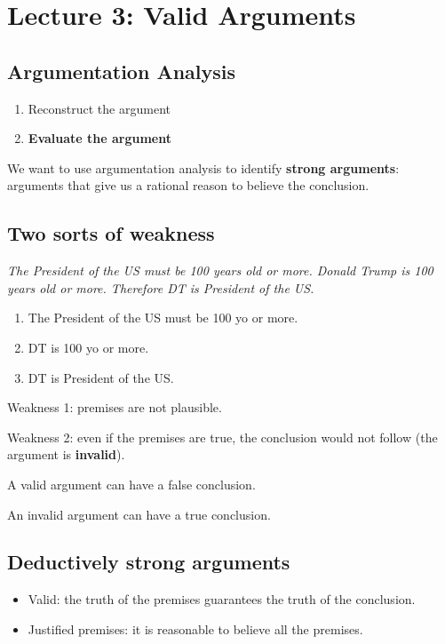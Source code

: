 
\section{Lecture 3: Valid Arguments}

\subsection{Argumentation Analysis}

\begin{enumerate}
    \item Reconstruct the argument
    \item \textbf{Evaluate the argument}
\end{enumerate}

We want to use argumentation analysis to identify
\textbf{strong arguments}: arguments that give us a rational
reason to believe the conclusion.

\subsection{Two sorts of weakness}

\textit{The President of the US must be 100 years old or more. Donald Trump
is 100 years old or more. Therefore DT is President of the US.}

\begin{enumerate}
    \item The President of the US must be 100 yo or more.
    \item DT is 100 yo or more.
    \item DT is President of the US.
\end{enumerate}

Weakness 1: premises are not plausible.

Weakness 2: even if the premises are true, the conclusion would not follow
(the argument is \textbf{invalid}).

A valid argument can have a false conclusion.

An invalid argument can have a true conclusion.

\subsection{Deductively strong arguments}

\begin{itemize}
    \item Valid: the truth of the premises guarantees the truth of the
        conclusion.
    \item Justified premises: it is reasonable to believe all the premises.
\end{itemize}

